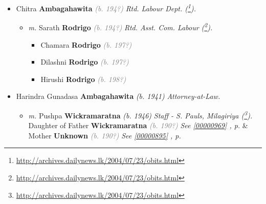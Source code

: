 \documentclass[10pt, openany]{book}
\begin{document}
\begin{itemize}
{\begin{itemize}
{\begin{itemize}
{\begin{itemize}
\item{Rangani \textbf{Kamalasuriya} \textcolor{slorange}{\textit{(b. 1969)}}
 }
\item{Nadeeka \textbf{Kamalasuriya} \textcolor{gray}{\textit{(b. 197?)}}
 }
\item{Malinda \textbf{Kamalasuriya} \textcolor{gray}{\textit{(b. 197?)}} \textcolor{slmaroon}{\textit{Business Owner in Australia (\footnote{\url{http://www.auscompanies.com/en/97987616985/KAMALASURIYA-MALINDA}}).}}
 }
\end{itemize}}
\end{itemize}
 }
\item{Chitra \textbf{Ambagahawita} \textcolor{gray}{\textit{(b. 194?)}} \textcolor{slmaroon}{\textit{Rtd. Labour Dept. (\footnote{\url{http://archives.dailynews.lk/2004/07/23/obits.html}}).}}
\begin{itemize}
\item{\textit{m.} Sarath \textbf{Rodrigo} \textcolor{gray}{\textit{(b. 194?)}} \textcolor{slmaroon}{\textit{Rtd. Asst. Com. Labour (\footnote{\url{http://archives.dailynews.lk/2004/07/23/obits.html}}).}}   \label{couple:00000075:00000665} \begin{itemize}
\item{Chamara \textbf{Rodrigo} \textcolor{gray}{\textit{(b. 197?)}}
 }
\item{Dilashni \textbf{Rodrigo} \textcolor{gray}{\textit{(b. 197?)}}
 }
\item{Hirushi \textbf{Rodrigo} \textcolor{gray}{\textit{(b. 198?)}}
 }
\end{itemize}}
\end{itemize}
 }
\item{Harindra Gunadasa \textbf{Ambagahawita} \textcolor{slorange}{\textit{(b. 1941)}} \textcolor{slmaroon}{\textit{Attorney-at-Law.}}
\begin{itemize}
\item{\textit{m.} Pushpa \textbf{Wickramaratna} \textcolor{slorange}{\textit{(b. 1946)}} \textcolor{slmaroon}{\textit{Staff - S. Pauls, Milagiriya (\footnote{\url{http://archives.dailynews.lk/2004/07/23/obits.html}}).}} Daughter of  Father \textbf{Wickramaratna} \textcolor{gray}{\textit{(b. 190?)}} \textcolor{slteal}{\textit{See  \autoref{00000969} \textit{, p. \pageref{00000969} }}}  \&  Mother \textbf{Unknown} \textcolor{gray}{\textit{(b. 190?)}} \textcolor{slteal}{\textit{See  \autoref{00000895} \textit{, p. \pageref{00000895} }}}   \label{couple:00000079:00000974} \begin{itemize}

\end{itemize}}
\end{itemize}}
\end{itemize}}
\end{itemize}
\end{document}
